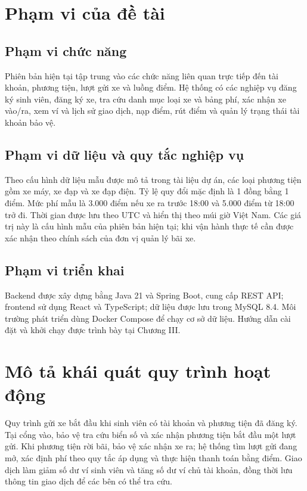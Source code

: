 \section{Phạm vi của đề tài}

\subsection{Phạm vi chức năng}
Phiên bản hiện tại tập trung vào các chức năng liên quan trực tiếp đến tài khoản, phương tiện, lượt gửi xe và luồng điểm. Hệ thống có các nghiệp vụ đăng ký sinh viên, đăng ký xe, tra cứu danh mục loại xe và bảng phí, xác nhận xe vào/ra, xem ví và lịch sử giao dịch, nạp điểm, rút điểm và quản lý trạng thái tài khoản bảo vệ.

\subsection{Phạm vi dữ liệu và quy tắc nghiệp vụ}
Theo cấu hình dữ liệu mẫu được mô tả trong tài liệu dự án, các loại phương tiện gồm xe máy, xe đạp và xe đạp điện. Tỷ lệ quy đổi mặc định là 1 đồng bằng 1 điểm. Mức phí mẫu là 3.000 điểm nếu xe ra trước 18:00 và 5.000 điểm từ 18:00 trở đi. Thời gian được lưu theo UTC và hiển thị theo múi giờ Việt Nam. Các giá trị này là cấu hình mẫu của phiên bản hiện tại; khi vận hành thực tế cần được xác nhận theo chính sách của đơn vị quản lý bãi xe.

\subsection{Phạm vi triển khai}
Backend được xây dựng bằng Java 21 và Spring Boot, cung cấp REST API; frontend sử dụng React và TypeScript; dữ liệu được lưu trong MySQL 8.4. Môi trường phát triển dùng Docker Compose để chạy cơ sở dữ liệu. Hướng dẫn cài đặt và khởi chạy được trình bày tại Chương III.

\section{Mô tả khái quát quy trình hoạt động}

Quy trình gửi xe bắt đầu khi sinh viên có tài khoản và phương tiện đã đăng ký. Tại cổng vào, bảo vệ tra cứu biển số và xác nhận phương tiện bắt đầu một lượt gửi. Khi phương tiện rời bãi, bảo vệ xác nhận xe ra; hệ thống tìm lượt gửi đang mở, xác định phí theo quy tắc áp dụng và thực hiện thanh toán bằng điểm. Giao dịch làm giảm số dư ví sinh viên và tăng số dư ví chủ tài khoản, đồng thời lưu thông tin giao dịch để các bên có thể tra cứu.

